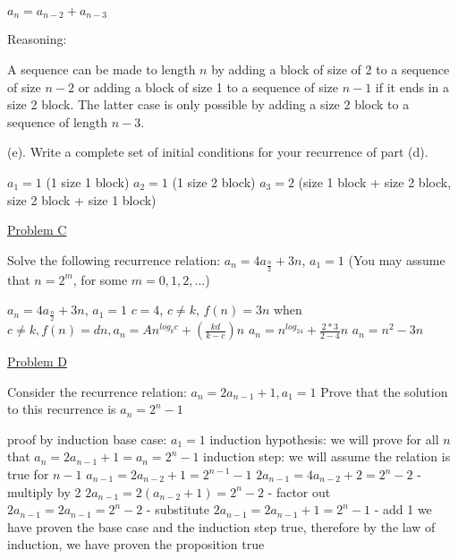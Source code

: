 \documentclass{article}
\begin{document}
$a_n=a_{n-2}+a_{n-3}$\newline{}

Reasoning:\newline{}

A sequence can be made to length $n$ by adding a block of size of 2 to a sequence of size $n-2$ or adding a block of size 1 to a sequence of size $n-1$ if it ends in a size 2 block. The latter case is only possible by adding a size 2 block to a sequence of length $n-3$.\newline{}

(e). Write a complete set of initial conditions for your recurrence of part (d).\newline{}

$a_1=1$ (1 size 1 block)\newline{}
$a_2=1$ (1 size 2 block)\newline{}
$a_3=2$ (size 1 block + size 2 block, size 2 block + size 1 block)\newline{}

\underline{Problem C}

Solve the following recurrence relation: $a_n=4a_{\frac{n}{2}}+3n$, $a_1=1$\newline{}
(You may assume that $n=2^m$, for some $m=0,1,2,...$)

$a_n=4a_{\frac{n}{2}}+3n$, $a_1=1$\newline{}
$c=4$, $c\neq k$, $f(n)=3n$\newline{}
when $c\neq k, f(n)=dn, a_n=An^{log_kc}+(\frac{kd}{k-c})n$\newline{}
$a_n=n^{log_24}+\frac{2*3}{2-4}n$\newline{}
$a_n=n^2-3n$\newline{}

\underline{Problem D}

Consider the recurrence relation: $a_n=2a_{n-1}+1, a_1=1$\newline{}
Prove that the solution to this recurrence is $a_n=2^{n}-1$\newline{}

proof by induction\newline{}
base case: $a_1=1$\newline{}
induction hypothesis: we will prove for all $n$ that $a_n=2a_{n-1}+1=a_n=2^n-1$\newline{}
induction step: we will assume the relation is true for $n-1$\newline{}
$a_{n-1}=2a_{n-2}+1=2^{n-1}-1$ \newline{}
$2a_{n-1}=4a_{n-2}+2=2^{n}-2$ - multiply by 2\newline{}
$2a_{n-1}=2(a_{n-2}+1)=2^n-2$ - factor out\newline{}
$2a_{n-1}=2a_{n-1}=2^n-2$ - substitute\newline{}
$2a_{n-1}=2a_{n-1}+1=2^n-1$ - add 1\newline{}
we have proven the base case and the induction step true, therefore by the law of induction, we have proven the proposition true
\end{document}
